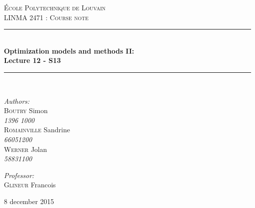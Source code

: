 \documentclass[10pt,a4paper]{article}
\newcommand{\HRule}{\rule{\linewidth}{0.5mm}}
\begin{document}
\begin{titlepage}
\begin{center}

\textsc{\LARGE École Polytechnique de Louvain}\\[1.5cm]

\textsc{\Large LINMA 2471 : Course note}\\[0.5cm]



\vfill
\HRule \\[0.4cm]
{ \huge \bfseries Optimization models and methods II: \\ Lecture 12 - S13 }\\[0.3cm]
\HRule \\[1.5cm]



\vfill
\begin{minipage}{0.4\textwidth}
\begin{flushleft} \large
\emph{Authors:}\\[0.2cm]
\textsc{Boutry} Simon \\ \textit{1396 1000}
\\[0.2cm]
\textsc{Romainville} Sandrine   \\ \textit{66051200}
\\[0.2cm]
\textsc{Werner} Jolan   \\ \textit{58831100}
\\[0.2cm]



\end{flushleft}
\end{minipage}
\begin{minipage}{0.4\textwidth}
\begin{flushright} \large

\emph{Professor:} \\[0.2cm]
\textsc{Glineur} Francois \\[0.4cm]

\end{flushright}
\end{minipage}

\vfill

{\large 8 december 2015}

\end{center}
\end{titlepage}
\end{document}
